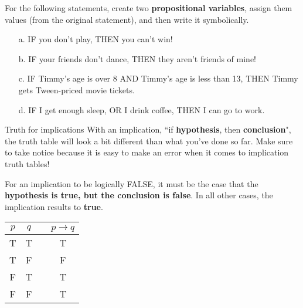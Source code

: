 {    
    \begin{questionNOGRADE}{\thequestion}
        For the following statements, create two
        \textbf{propositional variables}, assign them values (from
        the original statement), and then write it symbolically.

        \begin{enumerate}
            \item[a.] IF you don't play, THEN you can't win!
            \item[b.] IF your friends don't dance, THEN they aren't friends of mine!
            \item[c.] IF Timmy's age is over 8 AND Timmy's age is less than 13, THEN Timmy gets Tween-priced movie tickets.
            \item[d.] IF I get enough sleep, OR I drink coffee, THEN I can go to work.
        \end{enumerate}        
    \end{questionNOGRADE}

    \newpage

        \begin{intro}{Truth for implications}
            With an implication, ``if \textbf{hypothesis}, then \textbf{conclusion}",
            the truth table will look a bit different than what you've done so far.
            Make sure to take notice because it is easy to make an error when it
            comes to implication truth tables!

            For an implication to be logically FALSE, it must be the case that
            the \textbf{hypothesis is true, but the conclusion is false}. In
            all other cases, the implication results to \textbf{true}.

            \begin{center}
                \begin{tabular}{| c | c | c | c |}
                    \hline{}
                    $p$ & $q$ & & $p \to q$
                    \\ \hline
                    T & T & & T
                    \\ \hline

                    T & F & & F
                    \\ \hline

                    F & T & & T
                    \\ \hline

                    F & F & & T
                    \\ \hline
                \end{tabular}
            \end{center}


\end{intro}}
